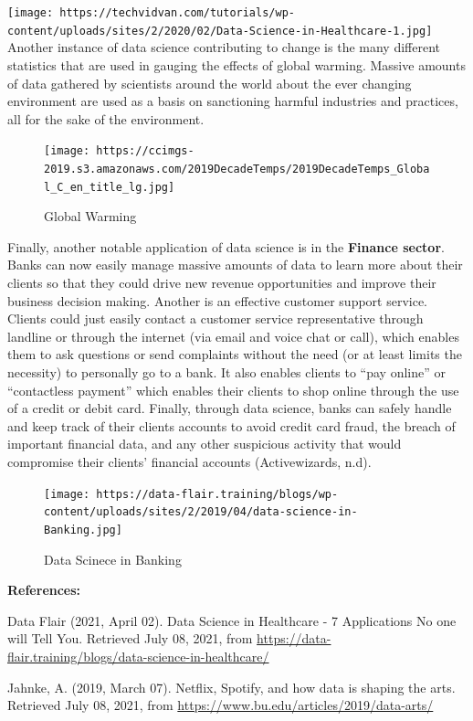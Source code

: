 \documentclass[
]{article}
\begin{document}
\texttt{[image: https://techvidvan.com/tutorials/wp-content/uploads/sites/2/2020/02/Data-Science-in-Healthcare-1.jpg]}
Another instance of data science contributing to change is the many
different statistics that are used in gauging the effects of global
warming. Massive amounts of data gathered by scientists around the world
about the ever changing environment are used as a basis on sanctioning
harmful industries and practices, all for the sake of the environment.

\begin{figure}
\centering
\texttt{[image: https://ccimgs-2019.s3.amazonaws.com/2019DecadeTemps/2019DecadeTemps\_Global\_C\_en\_title\_lg.jpg]}
\caption{Global Warming}
\end{figure}

Finally, another notable application of data science is in the
\textbf{Finance sector}. Banks can now easily manage massive amounts of
data to learn more about their clients so that they could drive new
revenue opportunities and improve their business decision making.
Another is an effective customer support service. Clients could just
easily contact a customer service representative through landline or
through the internet (via email and voice chat or call), which enables
them to ask questions or send complaints without the need (or at least
limits the necessity) to personally go to a bank. It also enables
clients to ``pay online'' or ``contactless payment'' which enables their
clients to shop online through the use of a credit or debit card.
Finally, through data science, banks can safely handle and keep track of
their clients accounts to avoid credit card fraud, the breach of
important financial data, and any other suspicious activity that would
compromise their clients' financial accounts (Activewizards, n.d).

\begin{figure}
\centering
\texttt{[image: https://data-flair.training/blogs/wp-content/uploads/sites/2/2019/04/data-science-in-Banking.jpg]}
\caption{Data Scinece in Banking}
\end{figure}

\textbf{References:}

Data Flair (2021, April 02). Data Science in Healthcare - 7 Applications
No one will Tell You. Retrieved July 08, 2021, from
\url{https://data-flair.training/blogs/data-science-in-healthcare/}

Jahnke, A. (2019, March 07). Netflix, Spotify, and how data is shaping
the arts. Retrieved July 08, 2021, from
\url{https://www.bu.edu/articles/2019/data-arts/}
\end{document}
